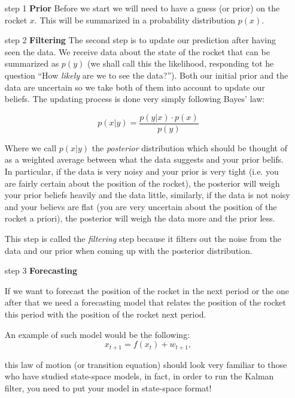 \documentclass[11pt]{article}
\theoremstyle{definition}
\begin{document}
\begin{itemize}
\item[step 1] \textbf{Prior}\newline
  Before we start we will need to have a guess (or prior) on the rocket $x$. This will be summarized in a probability distribution $p(x)$.
  \item[step 2] \textbf{Filtering}\newline
    The second step is to update our prediction after having seen the data. We receive data about the state of the rocket that can be summarized as $p(y)$ (we shall call this the likelihood, responding tot he question ``How \textit{likely} are we to see the data?''). Both our initial prior and the data are uncertain so we take both of them into account to update our beliefs. The updating process is done very simply following Bayes' law:

    \begin{equation}
      p(x|y) = \frac{p(y|x)\cdot p(x)}{p(y)}
    \end{equation}

    Where we call $p(x|y)$ the \textit{posterior} distribution which should be thought of as a weighted average between what the data suggests and your prior belifs. In particular, if the data is very noisy and your prior is very tight (i.e. you are fairly certain about the position of the rocket), the posterior will weigh your prior beliefs heavily and the data little, similarly, if the data is not noisy and your believs are flat (you are very uncertain about the position of the rocket a priori), the posterior will weigh the data more and the prior less.

    This step is called the \textit{filtering} step because it filters out the noise from the data and our prior when coming up with the posterior distribution.

\item[step 3] \textbf{Forecasting}\newline
  
  If we want to forecast the position of the rocket in the next period or the one after that we need a forecasting model that relates the position of the rocket this period with the position of the rocket next period.

An example of such model would be the following:  
  \begin{equation}
    x_{t+1} = f(x_{t}) + w_{t+1},
  \end{equation}

  this law of motion (or transition equation) should look very familiar to those who have studied state-space models, in fact, in order to run the Kalman filter, you need to put your model in state-space format!


\end{itemize}
\end{document}
